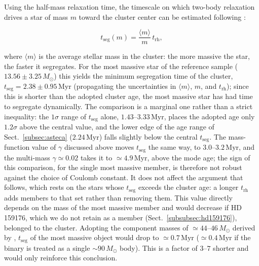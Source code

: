 \documentclass{aa}
\begin{document}
Using the half-mass relaxation time, the timescale on which two-body relaxation drives a star of mass $m$ toward the cluster center can be estimated following \citet{1969ApJ...158L.139S}:

\begin{equation}\label{eq:tseg}
t_{\mathrm{seg}}(m) = \frac{\langle m \rangle}{m}\, t_{\mathrm{rh}},
\end{equation}

where $\langle m \rangle$ is the average stellar mass in the cluster: the more massive the star, the faster it segregates. For the most massive star of the reference sample ($13.56 \pm 3.25\,M_\odot$) this yields the minimum segregation time of the cluster, $t_{\mathrm{seg}} = 2.38 \pm 0.95\,\mathrm{Myr}$ (propagating the uncertainties in $\langle m \rangle$, $m$, and $t_{\mathrm{rh}}$); since this is shorter than the adopted cluster age, the most massive star has had time to segregate dynamically. The comparison is a marginal one rather than a strict inequality: the $1\sigma$ range of $t_{\mathrm{seg}}$ alone, $1.43$--$3.33\,\mathrm{Myr}$, places the adopted age only $1.2\sigma$ above the central value, and the lower edge of the age range of Sect.~\ref{subsec:asteca} ($2.24\,\mathrm{Myr}$) falls slightly below the central $t_{\mathrm{seg}}$. The mass-function value of $\gamma$ discussed above moves $t_{\mathrm{seg}}$ the same way, to $3.0$--$3.2\,\mathrm{Myr}$, and the multi-mass $\gamma\simeq0.02$ takes it to $\simeq4.9\,\mathrm{Myr}$, above the mode age; the sign of this comparison, for the single most massive member, is therefore not robust against the choice of Coulomb constant. It does not affect the argument that follows, which rests on the stars whose $t_{\mathrm{seg}}$ exceeds the cluster age: a longer $t_{\mathrm{rh}}$ adds members to that set rather than removing them. This value directly depends on the mass of the most massive member and would decrease if HD 159176, which we do not retain as a member (Sect.~\ref{subsubsec:hd159176}), belonged to the cluster. Adopting the component masses of $\simeq44$--$46\,M_\odot$ derived by \citet{2016ApJ...832..211P}, $t_{\mathrm{seg}}$ of the most massive object would drop to $\simeq0.7\,\mathrm{Myr}$ ($\simeq0.4\,\mathrm{Myr}$ if the binary is treated as a single $\sim90\,M_\odot$ body). This is a factor of $3$--$7$ shorter and would only reinforce this conclusion.
\end{document}
